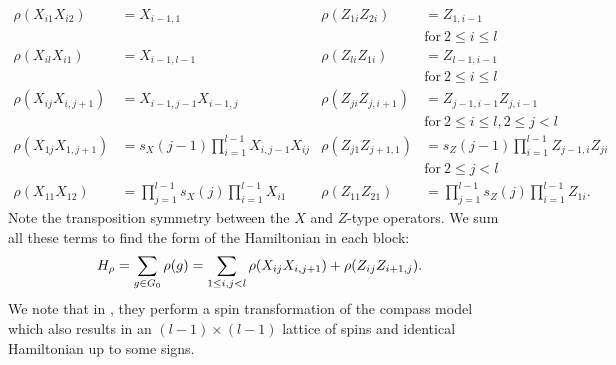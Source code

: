 \begin{align*}
\rho(X_{i1} X_{i2}) &= X_{i-1,1} &
\rho(Z_{1i} Z_{2i}) &= Z_{1,i-1} \\&&&\mbox{for}\ 2\le i\le l\\
\rho(X_{il} X_{i1}) &= X_{i-1,l-1} &
\rho(Z_{li} Z_{1i}) &= Z_{l-1,i-1} \\&&&\mbox{for}\ 2\le i\le l\\
\rho(X_{ij} X_{i,j+1}) &= X_{i-1,j-1} X_{i-1,j} &
\rho(Z_{ji} Z_{j,i+1}) &= Z_{j-1,i-1}Z_{j,i-1} \\&&&\mbox{for}\ 2\le i\le l, 2\le j<l\\
\rho(X_{1j} X_{1,j+1}) &= s_X(j-1) \prod_{i=1}^{l-1} X_{i,j-1} X_{ij} &
\rho(Z_{j1} Z_{j+1,1}) &= s_Z(j-1) \prod_{i=1}^{l-1} Z_{j-1,i} Z_{ji} \\&&&\mbox{for}\ 2\le j<l\\
\rho(X_{11} X_{12}) &= \prod_{j=1}^{l-1}s_X(j) \prod_{i=1}^{l-1} X_{i1} &
\rho(Z_{11} Z_{21}) &= \prod_{j=1}^{l-1}s_Z(j) \prod_{i=1}^{l-1} Z_{1i}.
\end{align*}
Note the transposition symmetry between the $X$ and $Z$-type operators.
We sum all these terms to find 
the form of the Hamiltonian in each block:
$$
H_\rho = \sum_{g\in G_0} \rho(g) = \sum_{1\le i,j<l} \rho(X_{ij}X_{i,j+1}) + \rho(Z_{ij}Z_{i+1,j}).
$$
We note that in \cite{Brzezicki2013},
they perform a
spin transformation of the compass model
which also results in an $(l-1)\times(l-1)$ lattice
of spins and identical Hamiltonian up to some signs.


%
%

